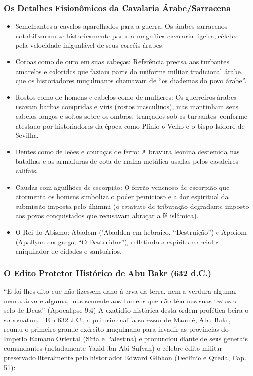 \subsubsection*{Os Detalhes Fisionômicos da Cavalaria Árabe/Sarracena}
\begin{itemize}
  \item Semelhantes a cavalos aparelhados para a guerra: Os árabes sarracenos notabilizaram-se historicamente por sua magnífica cavalaria ligeira, célebre pela velocidade inigualável de seus corcéis árabes.
  \item Coroas como de ouro em suas cabeças: Referência precisa aos turbantes amarelos e coloridos que faziam parte do uniforme militar tradicional árabe, que os historiadores muçulmanos chamavam de ``os diademas do povo árabe''.
  \item Rostos como de homens e cabelos como de mulheres: Os guerreiros árabes usavam barbas compridas e viris (rostos masculinos), mas mantinham seus cabelos longos e soltos sobre os ombros, trançados sob os turbantes, conforme atestado por historiadores da época como Plínio o Velho e o bispo Isidoro de Sevilha.
  \item Dentes como de leões e couraças de ferro: A bravura leonina destemida nas batalhas e as armaduras de cota de malha metálica usadas pelos cavaleiros califais.
  \item Caudas com aguilhões de escorpião: O ferrão venenoso de escorpião que atormenta os homens simboliza o poder pernicioso e a dor espiritual da submissão imposta pelo dhimmi (o estatuto de tributação degradante imposto aos povos conquistados que recusavam abraçar a fé islâmica).
  \item O Rei do Abismo: Abadom ('Abaddon em hebraico, ``Destruição'') e Apoliom (Apollyon em grego, ``O Destruidor''), refletindo o espírito marcial e aniquilador de cidades e santuários.
\end{itemize}



\subsubsection*{O Edito Protetor Histórico de Abu Bakr (632 d.C.)}
``E foi-lhes dito que não fizessem dano à erva da terra, nem a verdura alguma, nem a árvore alguma, mas somente aos homens que não têm nas suas testas o selo de Deus.'' (Apocalipse 9:4)
A exatidão histórica desta ordem profética beira o sobrenatural. Em 632 d.C., o primeiro califa sucessor de Maomé, Abu Bakr, reuniu o primeiro grande exército muçulmano para invadir as províncias do Império Romano Oriental (Síria e Palestina) e pronunciou diante de seus generais comandantes (notadamente Yazid ibn Abi Sufyan) o célebre édito militar preservado literalmente pelo historiador Edward Gibbon (Declínio e Queda, Cap. 51):

